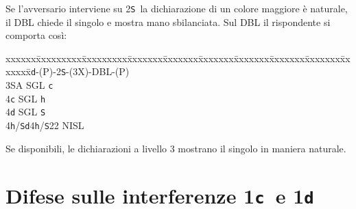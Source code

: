 \documentclass[a4paper,italian]{article}
\newcommand{\BS}{\small{\texttt{S}}}
\newcommand{\BC}{\small{\texttt{c}}}
\newcommand{\BD}{\small{\texttt{d}}}
\newcommand{\BH}{\small{\texttt{h}}}
\newcommand{\pdfc}{\texorpdfstring{\texttt{c}}{C}}
\newcommand{\pdfd}{\texorpdfstring{\texttt{d}}{D}}
\newenvironment{bidtable}
{\begin{tabbing}

    xxxxxx\=xxxxxxxxx\=xxxxxxxxx\=xxxxxxx\=xxxxxxx\=xxxxxxx\=xxxxxxx\=xxxxxxx\=xxxxxxx\=xxxxxxx\=\kill}
{\end{tabbing} }%
\newenvironment{attenzione}[1]
{\begin{tcolorbox}[colframe=red!80!white,title=#1]}
    {
\end{tcolorbox} }%
\begin{document}
\begin{attenzione}{Interferenze}
    Se l'avversario interviene su 2\BS\ la dichiarazione di un colore maggiore è naturale, il DBL chiede il singolo e mostra mano sbilanciata. Sul DBL il rispondente si comporta così:
    \bigbreak
    \begin{bidtable}
        1\BD-(P)-2\BS-(3X)-DBL-(P)\+\\
        3\small{SA} \> SGL \BC \\
        4\BC \> SGL \BH \\
        4\BD \> SGL \BS \\
        4\BH/\BS {}\BD 4\BH /\BS 22 NISL\-
    \end{bidtable}
    \bigbreak
    Se disponibili, le dichiarazioni a livello 3 mostrano il singolo in maniera naturale.
\end{attenzione}

\newpage

\section{Difese sulle interferenze 1\pdfc\ e 1\pdfd}
\end{document}
